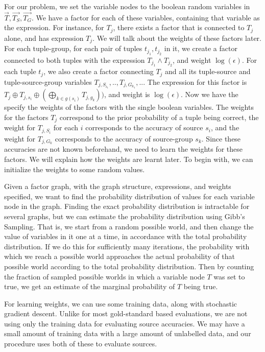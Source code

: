 \documentclass{sig-alternate}
\newcounter{prob}
\begin{document}
For our problem, we set the variable nodes to the boolean random variables in $\overrightarrow{T}, \overrightarrow{T_S}, \overrightarrow{T_G}$. We have a factor for each of these variables, containing that variable as the expression. For instance, for $T_j$, there exists a factor that is connected to $T_j$ alone, and has expression $T_j$. We will talk about the weights of these factors later. For each tuple-group, for each pair of tuples $t_{j_1}, t_{j_2}$ in it, we create a factor connected to both tuples with the expression $T_{j_1} \land T_{j_2}$, and weight $\log(\epsilon)$. For each tuple $t_j$, we also create a factor connecting $T_j$ and all its tuple-source and tuple-source-group variables $T_{j, S_{i_1}}, .., T_{j, G_{k_1}}, ..$. The expression for this factor is $T_j \oplus T_{j, s_i} \oplus(\bigoplus_{k\in g(s_i)} T_{j, g_k}))$, and weight is $\log(\epsilon)$. Now we have the specify the weights of the factors with the single boolean variables. The weights for the factors $T_j$ correspond to the prior probability of a tuple being correct, the weight for $T_{j, S_i}$ for each $i$ corresponds to the accuracy of source $s_i$, and the weight for $T_{j, G_k}$ corresponds to the accuracy of source-group $s_k$. Since these accuracies are not known beforehand, we need to learn the weights for these factors. We will explain how the weights are learnt later. To begin with, we can initialize the weights to some random values. 

Given a factor graph, with the graph structure, expressions, and weights specified, we want to find the probability distribution of values for each variable node in the graph. Finding the exact probability distribution is intractable for several graphs, but we can estimate the probability distribution using Gibb's Sampling. That is, we start from a random possible world, and then change the value of variables in it one at a time, in accordance with the total probability distribution. If we do this for sufficiently many iterations, the probability with which we reach a possible world approaches the actual probability of that possible world according to the total probability distribution. Then by counting the fraction of sampled possible worlds in which a variable node $T$ was set to true, we get an estimate of the marginal probability of $T$ being true. 

For learning weights, we can use some training data, along with stochastic gradient descent. Unlike for most gold-standard based evaluations, we are not using only the training data for evaluating source accuracies. We may have a small amount of training data with a large amount of unlabelled data, and our procedure uses both of these to evaluate sources. 
\end{document}
